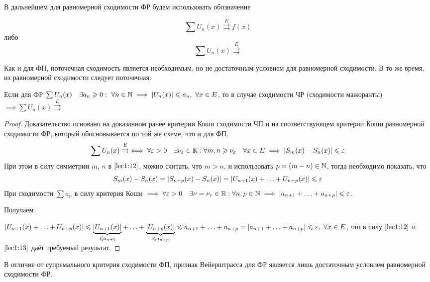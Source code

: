 \documentclass[../../main.tex]{subfiles}
\begin{document}
В дальнейшем для равномерной сходимости ФР будем использовать обозначение
 
\[ \sum U_n(x) \overset{E}{\rightrightarrows} f(x) \]
либо 
\[ \sum U_n(x) \overset{E}{\rightrightarrows} \]

Как и для ФП, поточечная сходимость является необходимым, 
но не достаточным условием для равномерной сходимости. В то же время,
из равномерной сходимости следует поточечная.

\begin{thm} 
Если для ФР $\sum U_n(x) \quad \exists a_n \geqslant 0 : \ \forall n \in \mathbb{N} 
\implies |U_n(x)| \leqslant a_n,\ \forall x \in E$, то в случае сходимости 
ЧР (сходимости мажоранты) $\implies \sum U_n(x) \overset{E}{\rightrightarrows}$
\end{thm}	 

\begin{proof}
Доказательство основано на доказанном ранее критерии Коши сходимости ЧП и на
соответствующем критерии Коши равномерной сходимости ФР, который обосновывается
по той же схеме, что и для ФП.
\begin{equation}
\label{lec1:12}
\sum U_n(x) \overset{E}{\rightrightarrows} \iff \forall \varepsilon > 0 \quad
\exists \nu_\varepsilon \in \mathbb{R} : \forall m,n \geqslant \nu_\varepsilon \quad
\forall x \in E \implies
|S_m(x) - S_n(x)| \leqslant \varepsilon
\end{equation}
При этом в силу симметрии $m$, $n$ в $\eqref{lec1:12}$, можно
считать, что $m > n$, и использовать $p = (m - n) \in \mathbb{N}$, тогда 
необходимо показать, что
\begin{equation}
\label{lec1:13}
S_m(x) - S_n(x) = |S_{n+p}(x) - S_n(x)| =
|U_{n+1}(x) + \ldots + U_{n+p}(x)| \leqslant \varepsilon
\end{equation}
При сходимости $\sum a_n$ в силу критерия Коши $\implies
\forall \varepsilon > 0 \quad \exists \nu = \nu_\varepsilon \in \mathbb{R} : 
\forall n, p \in \mathbb{N} \implies
|a_{n+1} + \ldots + a_{n+p}| \leqslant \varepsilon$.

Получаем

$|U_{n+1}(x) + \ldots + U_{n+p}(x)| \leqslant 
\underbrace{|U_{n+1}(x)|}_{\leqslant a_{n+1}} + \ldots + 
\underbrace{|U_{n+p}(x)|}_{\leqslant a_{n+p}} \leqslant
a_{n+1} + \ldots + a_{n+p} = |a_{n+1} + \ldots + a_{n+p}|
\leqslant \varepsilon,\ \forall x\in E$, что в силу $\eqref{lec1:12}$ и 
$\eqref{lec1:13}$ даёт требуемый результат.
\end{proof}	

\begin{rem}
В отличие от супремального критерия сходимости ФП,
признак Вейерштрасса для ФР является лишь достаточным условием 
равномерной сходимости ФР. 
\end{rem}	
\end{document}
